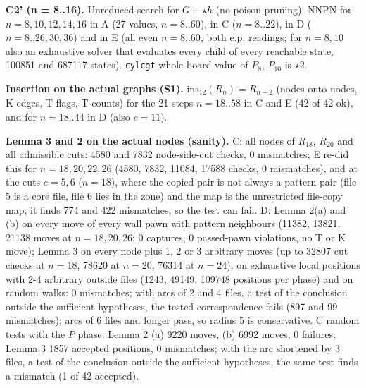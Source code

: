 \textbf{C2' (n = 8..16).} Unreduced search for $G+\star h$ (no poison pruning): NNPN for $n=8,10,12,14,16$ in A (27 values, $n=8..60$), in C ($n=8..22$), in D ($n=8..26,30,36$) and in E (all even $n=8..60$, both e.p. readings; for $n=8,10$ also an exhaustive solver that evaluates every child of every reachable state, 100851 and 687117 states). \texttt{cylcgt} whole-board value of $P_8$, $P_{10}$ is $\star2$.

\textbf{Insertion on the actual graphs (S1).} $\mathrm{ins}_{12}(R_n)=R_{n+2}$ (nodes onto nodes, K-edges, T-flags, T-counts) for the 21 steps $n=18..58$ in C and E (42 of 42 ok), and for $n=18..44$ in D (also $c=11$).

\textbf{Lemma 3 and 2 on the actual nodes (sanity).} C: all nodes of $R_{18}$, $R_{20}$ and all admissible cuts: 4580 and 7832 node-side-cut checks, 0 mismatches; E re-did this for $n=18,20,22,26$ (4580, 7832, 11084, 17588 checks, 0 mismatches), and at the cuts $c=5,6$ ($n=18$), where the copied pair is not always a pattern pair (file 5 is a core file, file 6 lies in the zone) and the map is the unrestricted file-copy map, it finds 774 and 422 mismatches, so the test can fail. D: Lemma 2(a) and (b) on every move of every wall pawn with pattern neighbours (11382, 13821, 21138 moves at $n=18,20,26$; 0 captures, 0 passed-pawn violations, no T or K move); Lemma 3 on every node plus 1, 2 or 3 arbitrary moves (up to 32807 cut checks at $n=18$, 78620 at $n=20$, 76314 at $n=24$), on exhaustive local positions with 2-4 arbitrary outside files (1243, 49149, 109748 positions per phase) and on random walks: 0 mismatches; with arcs of 2 and 4 files, a test of the conclusion outside the sufficient hypotheses, the tested correspondence fails (897 and 99 mismatches); arcs of 6 files and longer pass, so radius 5 is conservative. C random tests with the $P$ phase: Lemma 2 (a) 9220 moves, (b) 6992 moves, 0 failures; Lemma 3 1857 accepted positions, 0 mismatches; with the arc shortened by 3 files, a test of the conclusion outside the sufficient hypotheses, the same test finds a mismatch (1 of 42 accepted).

